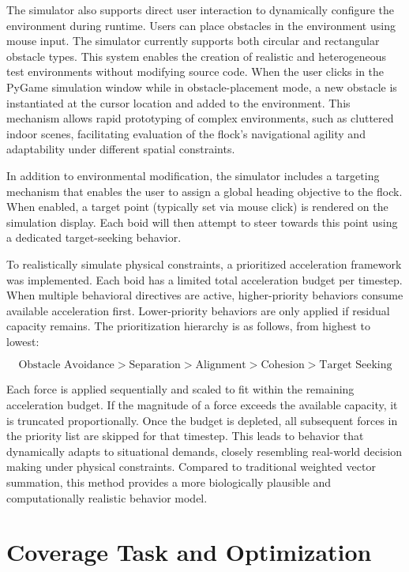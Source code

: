 \documentclass[12pt]{article}
\begin{document}
\begin{linenumbers}
The simulator also supports direct user interaction to dynamically configure the environment during runtime. Users can place obstacles in the environment using mouse input. The simulator currently supports both circular and rectangular obstacle types. This system enables the creation of realistic and heterogeneous test environments without modifying source code. When the user clicks in the PyGame simulation window while in obstacle-placement mode, a new obstacle is instantiated at the cursor location and added to the environment. This mechanism allows rapid prototyping of complex environments, such as cluttered indoor scenes, facilitating evaluation of the flock's navigational agility and adaptability under different spatial constraints.

In addition to environmental modification, the simulator includes a targeting mechanism that enables the user to assign a global heading objective to the flock. When enabled, a target point (typically set via mouse click) is rendered on the simulation display. Each boid will then attempt to steer towards this point using a dedicated target-seeking behavior.

\sloppypar
To realistically simulate physical constraints, a prioritized acceleration framework was implemented. Each boid has a limited total acceleration budget per timestep. When multiple behavioral directives are active, higher-priority behaviors consume available acceleration first. Lower-priority behaviors are only applied if residual capacity remains. The prioritization hierarchy is as follows, from highest to lowest:

\[\text{Obstacle Avoidance} > \text{Separation} > \text{Alignment} > \text{Cohesion} > \text{Target Seeking}\]

Each force is applied sequentially and scaled to fit within the remaining acceleration budget. If the magnitude of a force exceeds the available capacity, it is truncated proportionally. Once the budget is depleted, all subsequent forces in the priority list are skipped for that timestep. This leads to behavior that dynamically adapts to situational demands, closely resembling real-world decision making under physical constraints. Compared to traditional weighted vector summation, this method provides a more biologically plausible and computationally realistic behavior model.

\section{Coverage Task and Optimization}


\end{linenumbers}
\end{document}
